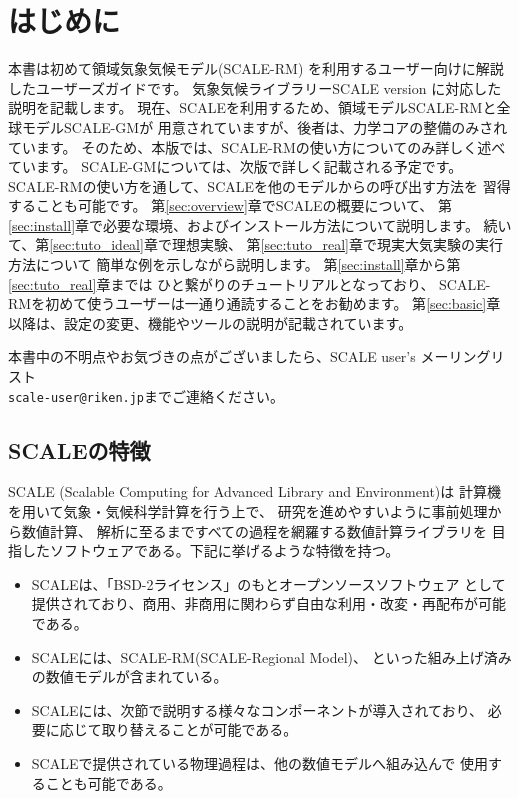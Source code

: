 \section{はじめに}

本書は初めて領域気象気候モデル(SCALE-RM)
を利用するユーザー向けに解説したユーザーズガイドです。
気象気候ライブラリーSCALE version \version に対応した説明を記載します。
現在、SCALEを利用するため、領域モデルSCALE-RMと全球モデルSCALE-GMが
用意されていますが、後者は、力学コアの整備のみされています。
そのため、本版では、SCALE-RMの使い方についてのみ詳しく述べています。
SCALE-GMについては、次版で詳しく記載される予定です。
SCALE-RMの使い方を通して、SCALEを他のモデルからの呼び出す方法を
習得することも可能です。
第\ref{sec:overview}章でSCALEの概要について、
第\ref{sec:install}章で必要な環境、およびインストール方法について説明します。
続いて、第\ref{sec:tuto_ideal}章で理想実験、
第\ref{sec:tuto_real}章で現実大気実験の実行方法について
簡単な例を示しながら説明します。
第\ref{sec:install}章から第\ref{sec:tuto_real}章までは
ひと繋がりのチュートリアルとなっており、
SCALE-RMを初めて使うユーザーは一通り通読することをお勧めます。
第\ref{sec:basic}章以降は、設定の変更、機能やツールの説明が記載されています。

本書中の不明点やお気づきの点がございましたら、SCALE user's メーリングリスト\\
 \verb|scale-user@riken.jp|までご連絡ください。



\subsection{SCALEの特徴}

SCALE (Scalable Computing for Advanced Library and Environment)は
計算機を用いて気象・気候科学計算を行う上で、
研究を進めやすいように事前処理から数値計算、
解析に至るまですべての過程を網羅する数値計算ライブラリを
目指したソフトウェアである。下記に挙げるような特徴を持つ。
\begin{itemize}
\item SCALEは、「BSD-2ライセンス」のもとオープンソースソフトウェア
として提供されており、商用、非商用に関わらず自由な利用・改変・再配布が可能である。
\item SCALEには、SCALE-RM(SCALE-Regional Model)、
といった組み上げ済みの数値モデルが含まれている。
\item SCALEには、次節で説明する様々なコンポーネントが導入されており、
必要に応じて取り替えることが可能である。
\item SCALEで提供されている物理過程は、他の数値モデルへ組み込んで
使用することも可能である。
\end{itemize}

